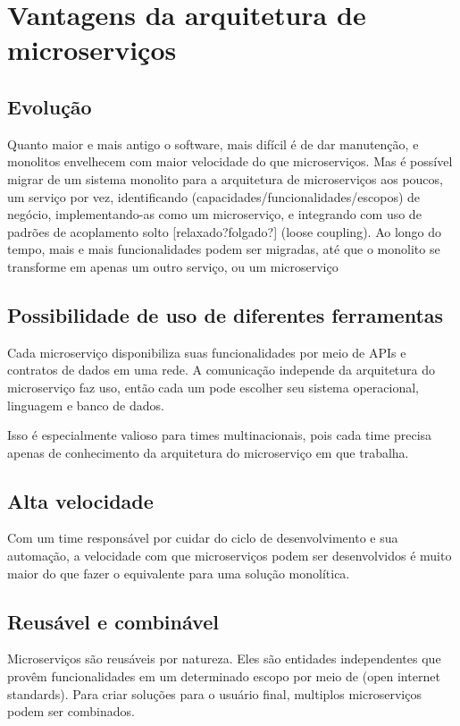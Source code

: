 \section{Vantagens da arquitetura de microserviços}

\subsection{Evolução}

Quanto maior e mais antigo o software, mais difícil é de dar manutenção, e monolitos envelhecem com maior velocidade do que microserviços. Mas é possível migrar de um sistema monolito para a arquitetura de microserviços aos poucos, um serviço por vez, identificando (capacidades/funcionalidades/escopos) de negócio, implementando-as como um microserviço, e integrando com uso de padrões de acoplamento solto [relaxado?folgado?] (loose coupling). Ao longo do tempo, mais e mais funcionalidades podem ser migradas, até que o monolito se transforme em apenas um outro serviço, ou um microserviço

\subsection{Possibilidade de uso de diferentes ferramentas}

Cada microserviço disponibiliza suas funcionalidades por meio de APIs e contratos de dados em uma rede. A comunicação independe da arquitetura do microserviço faz uso, então cada um pode escolher seu sistema operacional, linguagem e banco de dados.

Isso é especialmente valioso para times multinacionais, pois cada time precisa apenas de conhecimento da arquitetura do microserviço em que trabalha.

\subsection{Alta velocidade}

Com um time responsável por cuidar do ciclo de desenvolvimento e sua automação, a velocidade com que microserviços podem ser desenvolvidos é muito maior do que fazer o equivalente para uma solução monolítica.

\subsection{Reusável e combinável}

Microserviços são reusáveis por natureza. Eles são entidades independentes que provêm funcionalidades em um determinado escopo por meio de (open internet standards). Para criar soluções para o usuário final, multiplos microserviços podem ser combinados.

